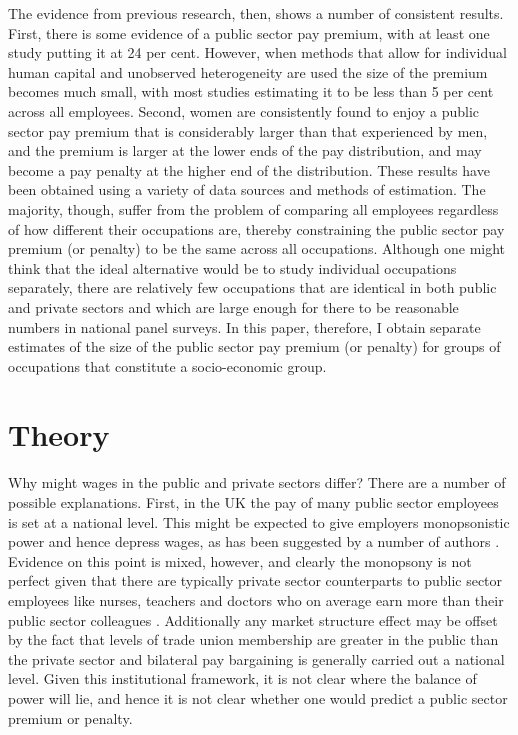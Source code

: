 \documentclass[a4paper,11pt,titlepage]{article}
\begin{document}
The evidence from previous research, then, shows a number of consistent results. First, there is some evidence of a public sector pay premium, with at least one study putting it at 24 per cent.  However, when methods that allow for individual human capital and unobserved heterogeneity are used the size of the premium becomes much small, with most studies estimating it to be less than 5 per cent across all employees.  Second, women are consistently found to enjoy a public sector pay premium that is considerably larger than that experienced by men, and the premium is larger at the lower ends of the pay distribution, and may become a pay penalty at the higher end of the distribution.  These results have been obtained using a variety of data sources and methods of estimation.  The majority, though, suffer from the problem of comparing all employees regardless of how different their occupations are, thereby constraining the public sector pay premium (or penalty) to be the same across all occupations.  Although one might think that the ideal alternative would be to study individual occupations separately, there are relatively few occupations that are identical in both public and private sectors and which are large enough for there to be reasonable numbers in national panel surveys.  In this paper, therefore, I obtain separate estimates of the size of the public sector pay premium (or penalty) for groups of occupations that constitute a socio-economic group.



\section{Theory}

Why might wages in the public and private sectors differ? There are a number of possible explanations.  First, in the UK the pay of many public sector employees is set at a national level.  This might be expected to give employers monopsonistic power and hence depress wages, as has been suggested by a number of authors \citep{Boal1997}.  Evidence on this point is mixed, however, and clearly the monopsony is not perfect given that there are typically private sector counterparts to public sector employees like nurses, teachers and doctors who on average earn more than their public sector colleagues \citep{Barron2012}. Additionally any market structure effect may be offset by the fact that levels of trade union membership are greater in the public than the private sector and bilateral pay bargaining is generally carried out a national level.  Given this institutional framework, it is not clear where the balance of power will lie, and hence it is not clear whether one would predict a public sector premium or penalty.
\end{document}
